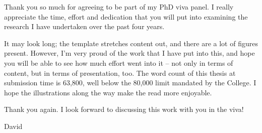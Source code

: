 
\begin{preamble}

Thank you so much for agreeing to be part of my PhD viva panel. I really appreciate the time, effort and dedication that you will put into examining the research I have undertaken over the past four years.

It may look long; the template stretches content out, and there are a lot of figures present. However, I'm very proud of the work that I have put into this, and hope you will be able to see how much effort went into it -- not only in terms of content, but in terms of presentation, too. The word count of this thesis at submission time is 63,800, well below the 80,000 limit mandated by the College. I hope the illustrations along the way make the read more enjoyable.

Thank you again. I look forward to discussing this work with you in the viva!

David

\end{preamble}